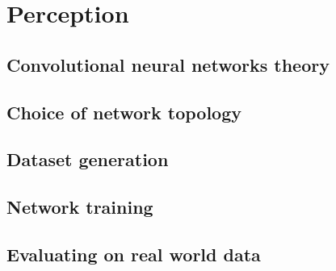 \chapter{Perception}

\section{Convolutional neural networks theory}





\section{Choice of network topology}




\section{Dataset generation}





\section{Network training}



\section{Evaluating on real world data}

